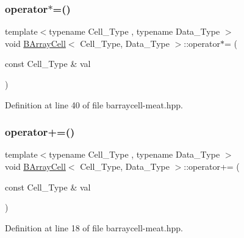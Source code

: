 \mbox{\label{class_b_array_cell_abc193e5d3dd8d04e5d4bb8d808fde35d}} 
\subsubsection{\texorpdfstring{operator$\ast$=()}{operator*=()}}
{\footnotesize\ttfamily template$<$typename Cell\+\_\+\+Type , typename Data\+\_\+\+Type $>$ \\
void \hyperlink{class_b_array_cell}{B\+Array\+Cell}$<$ Cell\+\_\+\+Type, Data\+\_\+\+Type $>$\+::operator$\ast$= (\begin{DoxyParamCaption}\item[{const Cell\+\_\+\+Type \&}]{val }\end{DoxyParamCaption})\hspace{0.3cm}{\ttfamily [inline]}}



Definition at line 40 of file barraycell-\/meat.\+hpp.

\mbox{\label{class_b_array_cell_a2e5c7efcf17bf4acaf17900fb781827b}} 
\subsubsection{\texorpdfstring{operator+=()}{operator+=()}}
{\footnotesize\ttfamily template$<$typename Cell\+\_\+\+Type , typename Data\+\_\+\+Type $>$ \\
void \hyperlink{class_b_array_cell}{B\+Array\+Cell}$<$ Cell\+\_\+\+Type, Data\+\_\+\+Type $>$\+::operator+= (\begin{DoxyParamCaption}\item[{const Cell\+\_\+\+Type \&}]{val }\end{DoxyParamCaption})\hspace{0.3cm}{\ttfamily [inline]}}



Definition at line 18 of file barraycell-\/meat.\+hpp.

\mbox{\label{class_b_array_cell_a2f2d39b5e9dfe7d0ef62a42445c85439}} 
